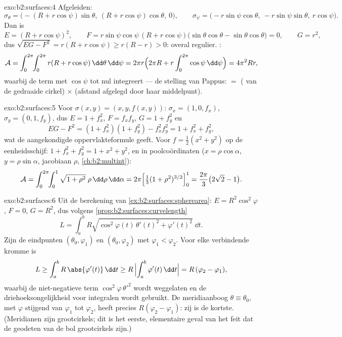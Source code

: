 \begin{solution}{exo:b2:surfaces:4}
Afgeleiden:
\[
\sigma_\theta = \bigl(-(R + r\cos\psi)\sin\theta,\
(R + r\cos\psi)\cos\theta,\ 0\bigr),
\qquad
\sigma_\psi = \bigl(-r\sin\psi\cos\theta,\
-r\sin\psi\sin\theta,\ r\cos\psi\bigr).
\]
Dan is
\[
E = (R + r\cos\psi)^2,
\qquad
F = r\sin\psi\cos\psi\,(R + r\cos\psi)
\bigl(\sin\theta\cos\theta - \sin\theta\cos\theta\bigr) = 0,
\qquad
G = r^2 ,
\]
dus $\sqrt{EG - F^2} = r(R + r\cos\psi) \geq r(R - r) > 0$: overal
regulier. :
\[
\mathcal{A}
= \int_0^{2\pi}\!\!\int_0^{2\pi} r(R + r\cos\psi)
\,\dd\theta\,\dd\psi
= 2\pi r \Bigl(2\pi R + r\int_0^{2\pi}\cos\psi\,\dd\psi\Bigr)
= 4\pi^2 R r ,
\]
waarbij de term met $\cos\psi$ tot nul integreert --- de stelling
van Pappus:  $=$ ( van de gedraaide cirkel)
$\times$ (afstand afgelegd door haar middelpunt).
\end{solution}

\begin{solution}{exo:b2:surfaces:5}
Voor $\sigma(x, y) = (x, y, f(x,y))$: $\sigma_x = (1, 0, f_x)$,
$\sigma_y = (0, 1, f_y)$, dus $E = 1 + f_x^2$, $F = f_xf_y$, $G = 1
+ f_y^2$ en
\[
EG - F^2 = (1 + f_x^2)(1 + f_y^2) - f_x^2f_y^2
= 1 + f_x^2 + f_y^2 ,
\]
wat de aangekondigde oppervlakteformule geeft. Voor $f =
\frac12(x^2 + y^2)$ op de eenheidsschijf: $1 + f_x^2 + f_y^2 = 1 +
x^2 + y^2$, en in poolcoördinaten ($x = \rho\cos\alpha$, $y =
\rho\sin\alpha$, jacobiaan $\rho$, \cref{ch:b2:multint}):
\[
\mathcal{A}
= \int_0^{2\pi}\!\!\int_0^1 \sqrt{1 + \rho^2}\;\rho
\,\dd\rho\,\dd\alpha
= 2\pi\Bigl[\tfrac13(1 + \rho^2)^{3/2}\Bigr]_0^1
= \frac{2\pi}{3}\bigl(2\sqrt2 - 1\bigr).
\]
\end{solution}

\begin{solution}{exo:b2:surfaces:6}
Uit de berekening van \cref{ex:b2:surfaces:spherearea}: $E =
R^2\cos^2\varphi$, $F = 0$, $G = R^2$, dus volgens
\cref{prop:b2:surfaces:curvelength}
\[
L = \int_a^b R\sqrt{\cos^2\varphi(t)\,\theta'(t)^2
+ \varphi'(t)^2}\;\dd t .
\]
Zijn de eindpunten $(\theta_0, \varphi_1)$ en $(\theta_0,
\varphi_2)$ met $\varphi_1 < \varphi_2$. Voor elke verbindende
kromme is
\[
L \geq \int_a^b R\,\abs{\varphi'(t)}\,\dd t
\geq R\,\Bigl|\int_a^b \varphi'(t)\,\dd t\Bigr|
= R\,(\varphi_2 - \varphi_1),
\]
waarbij de niet-negatieve term $\cos^2\varphi\,\theta'^2$ wordt
weggelaten en de driehoeksongelijkheid voor integralen wordt
gebruikt. De meridiaanboog $\theta \equiv \theta_0$, met $\varphi$
stijgend van $\varphi_1$ tot $\varphi_2$, heeft  precies
$R(\varphi_2 - \varphi_1)$: zij is de kortste. (Meridianen zijn
grootcirkels; dit is het eerste, elementaire geval van het feit dat
de geodeten van de bol grootcirkels zijn.)
\end{solution}

